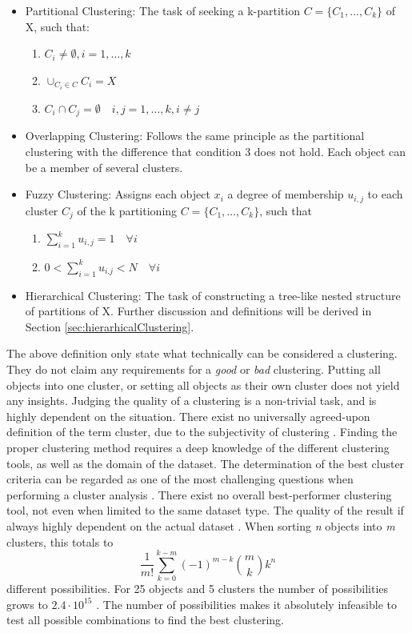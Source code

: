 \documentclass[a4paper,10pt]{article}
\theoremstyle{plain}
\theoremstyle{definition}
\begin{document}
\begin{itemize}
	\item Partitional Clustering: The task of seeking a k-partition $C = \{ C_1, \dots, C_k \}$ of X, such that:
	\begin{enumerate}
		\item $C_i \neq \emptyset, i = 1, \dots, k$
		\item $\cup_{C_i \in C} C_i = X$
		\item $C_i \cap C_j = \emptyset \quad i,j = 1, \dots, k, i \neq j$
	\end{enumerate} 
	\item Overlapping Clustering: Follows the same principle as the partitional clustering with the difference that condition 3 does not hold. Each object can be a member of several clusters.
	\item Fuzzy Clustering: Assigns each object $x_i$ a degree of membership $u_{i,j}$ to each cluster $C_j$ of the k partitioning $C = \{ C_1, \dots, C_k \}$, such that
	\begin{enumerate}
		\item $\sum_{i = 1}^{k} u_{i,j} = 1 \quad \forall i$
		\item $0 < \sum_{i = 1}^{k} u_{i.j} < N \quad \forall i$
	\end{enumerate}
	\item Hierarchical Clustering: The task of constructing a tree-like nested structure of partitions of X. Further discussion and definitions will be derived in Section \ref{sec:hierarhicalClustering}.
\end{itemize}
The above definition only state what technically can be considered a clustering. They do not claim any requirements for a \textit{good} or \textit{bad} clustering. Putting all objects into one cluster, or setting all objects as their own cluster does not yield any insights. Judging the quality of a clustering is a non-trivial task, and is highly dependent on the situation. There exist no universally agreed-upon definition of the term cluster, due to the subjectivity of clustering \cite{15overview}. Finding the proper clustering method requires a deep knowledge of the different clustering tools, as well as the domain of the dataset. The determination of the best cluster criteria can be regarded as one of the most challenging questions when performing a cluster analysis \cite{clusteringOverview}. There exist no overall best-performer clustering tool, not even when limited to the same dataset type. The quality of the result if always highly dependent on the actual dataset \cite{17overview}. When sorting \textit{n} objects into \textit{m} clusters, this totals to 
\begin{equation*}
\frac{1}{m!}\sum_{k = 0}^{k - m} (-1)^{m - k}  { m \choose k } k^n
\end{equation*}
different possibilities. For 25 objects and 5 clusters the number of possibilities grows to $2.4 \cdot 10^{15}$ \cite{18overview}. The number of possibilities makes it absolutely infeasible to test all possible combinations to find the best clustering. 
\end{document}
